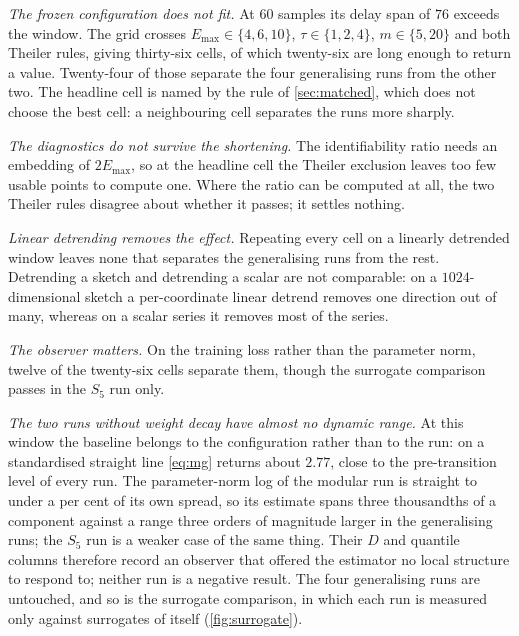 \documentclass[twoside]{article}
\begin{document}
\emph{The frozen configuration does not fit.} At $60$ samples its delay span of $76$ exceeds the
window. The grid crosses $E_{\max} \in \{4, 6, 10\}$,
$\tau \in \{1, 2, 4\}$, $m \in \{5, 20\}$ and both Theiler rules, giving thirty-six cells, of which
twenty-six are long enough to return a value. Twenty-four of those separate the four generalising
runs from the other two. The headline cell is named by the rule of \cref{sec:matched}, which does
not choose the best cell: a neighbouring cell separates the runs more sharply.

\emph{The diagnostics do not survive the shortening.} The identifiability ratio needs an embedding
of $2E_{\max}$, so at the headline cell the Theiler exclusion leaves too few usable points to
compute one. Where the ratio can be computed at all, the two Theiler rules disagree about whether
it passes; it settles nothing.

\emph{Linear detrending removes the effect.} Repeating every cell on a linearly detrended window
leaves none that separates the generalising runs from the rest. Detrending a sketch and
detrending a scalar are not comparable: on a $1024$-dimensional sketch a per-coordinate linear
detrend removes one direction out of many, whereas on a scalar series it removes most of the
series.

\emph{The observer matters.} On the training loss rather than the parameter norm, twelve of the
twenty-six cells separate them, though the surrogate comparison passes in the $S_5$ run
only.

\emph{The two runs without weight decay have almost no dynamic range.} At this window the baseline
belongs to the configuration rather than to the run: on a standardised straight line \cref{eq:mg}
returns about $2.77$, close to the pre-transition level of every run. The parameter-norm log of the
modular run is straight to under a per cent of its own spread, so its estimate spans three
thousandths of a component against a range three orders of magnitude larger in the generalising
runs; the $S_5$ run is a weaker case of the same thing. Their $D$ and quantile columns therefore
record an observer that offered the estimator no local structure to respond to; neither run is a
negative result. The four generalising runs are untouched, and so is the surrogate comparison, in
which each run is measured only against surrogates of itself (\cref{fig:surrogate}).
\end{document}

